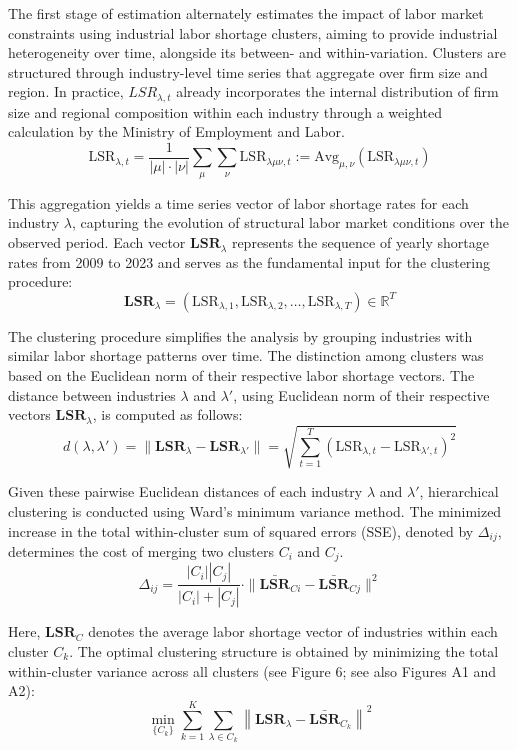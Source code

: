 \documentclass[
  12pt,
]{article}
\begin{document}
The first stage of estimation alternately estimates the impact of labor
market constraints using industrial labor shortage clusters, aiming to
provide industrial heterogeneity over time, alongside its between- and
within-variation. Clusters are structured through industry-level time
series that aggregate over firm size and region. In practice,
\(LSR_{\lambda,t}\) already incorporates the internal distribution of
firm size and regional composition within each industry through a
weighted calculation by the Ministry of Employment and Labor. \[
\text{LSR}_{\lambda,t} = \frac{1}{|\mu| \cdot |\nu|} \sum_\mu \sum_\nu \text{LSR}_{\lambda\mu\nu,t} := \text{Avg}_{\mu,\nu}\left( \text{LSR}_{\lambda\mu\nu,t} \right)
\]

This aggregation yields a time series vector of labor shortage rates for
each industry \(\lambda\), capturing the evolution of structural labor
market conditions over the observed period. Each vector
\(\mathbf{LSR}_\lambda\) represents the sequence of yearly shortage
rates from 2009 to 2023 and serves as the fundamental input for the
clustering procedure: \[
\mathbf{LSR}_\lambda = \left( \text{LSR}_{\lambda,1}, \text{LSR}_{\lambda,2}, \dots, \text{LSR}_{\lambda,T} \right) \in \mathbb{R}^T
\]

The clustering procedure simplifies the analysis by grouping industries
with similar labor shortage patterns over time. The distinction among
clusters was based on the Euclidean norm of their respective labor
shortage vectors. The distance between industries \(\lambda\) and
\(\lambda'\), using Euclidean norm of their respective vectors
\(\mathbf{LSR}_\lambda\), is computed as follows: \[
d\left( \lambda, \lambda' \right) = \| \mathbf{LSR}_\lambda - \mathbf{LSR}_{\lambda'} \| = \sqrt{ \sum_{t=1}^{T} \left( \text{LSR}_{\lambda,t} - \text{LSR}_{\lambda',t} \right)^2 }
\]

Given these pairwise Euclidean distances of each industry \(\lambda\)
and \(\lambda'\), hierarchical clustering is conducted using Ward's
minimum variance method. The minimized increase in the total
within-cluster sum of squared errors (SSE), denoted by \(\Delta_{ij}\),
determines the cost of merging two clusters \(C_i\) and \(C_j\). \[
\Delta_{ij}=\frac{|C_i||C_j|}{|C_i| + |C_j|} \cdot \| \mathbf{\bar{LSR}}_{Ci} - \mathbf{\bar{LSR}}_{Cj} \|^2
\]

Here, \(\mathbf{LSR}_C\) denotes the average labor shortage vector of
industries within each cluster \(C_k\). The optimal clustering structure
is obtained by minimizing the total within-cluster variance across all
clusters (see Figure 6; see also Figures A1 and A2): \[
\min_{\{C_k\}} \sum_{k=1}^{K} \sum_{\lambda \in C_k} \left\| \mathbf{LSR}_\lambda - \bar{\mathbf{LSR}}_{C_k} \right\|^2
\]
\end{document}

